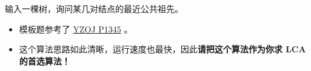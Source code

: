 \noindent 输入一棵树，询问某几对结点的最近公共祖先。

\begin{itemize}
    \item 模板题参考了 \href{https://oiproxy.bugminer.top/OnlineJudge/problem_show.php?id=1345}{YZOJ P1345} 。
    \item 这个算法思路如此清晰，运行速度也最快，因此\textbf{请把这个算法作为你求 LCA 的首选算法！}
\end{itemize}
